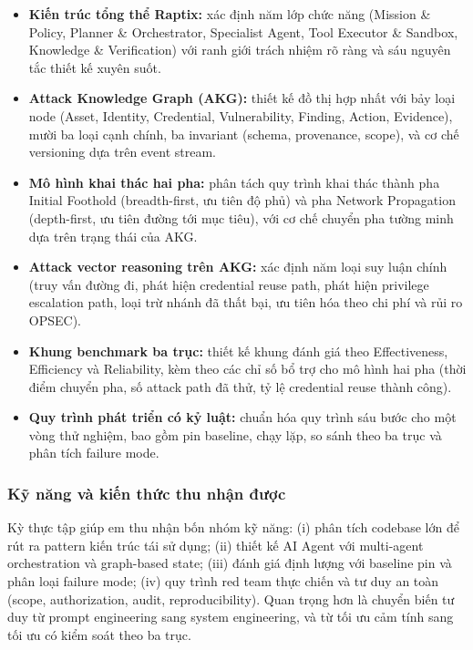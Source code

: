 \begin{itemize}
    \item \textbf{Kiến trúc tổng thể Raptix:} xác định năm lớp chức năng (Mission \& Policy, Planner \& Orchestrator, Specialist Agent, Tool Executor \& Sandbox, Knowledge \& Verification) với ranh giới trách nhiệm rõ ràng và sáu nguyên tắc thiết kế xuyên suốt.
    \item \textbf{Attack Knowledge Graph (AKG):} thiết kế đồ thị hợp nhất với bảy loại node (Asset, Identity, Credential, Vulnerability, Finding, Action, Evidence), mười ba loại cạnh chính, ba invariant (schema, provenance, scope), và cơ chế versioning dựa trên event stream.
    \item \textbf{Mô hình khai thác hai pha:} phân tách quy trình khai thác thành pha Initial Foothold (breadth-first, ưu tiên độ phủ) và pha Network Propagation (depth-first, ưu tiên đường tới mục tiêu), với cơ chế chuyển pha tường minh dựa trên trạng thái của AKG.
    \item \textbf{Attack vector reasoning trên AKG:} xác định năm loại suy luận chính (truy vấn đường đi, phát hiện credential reuse path, phát hiện privilege escalation path, loại trừ nhánh đã thất bại, ưu tiên hóa theo chi phí và rủi ro OPSEC).
    \item \textbf{Khung benchmark ba trục:} thiết kế khung đánh giá theo Effectiveness, Efficiency và Reliability, kèm theo các chỉ số bổ trợ cho mô hình hai pha (thời điểm chuyển pha, số attack path đã thử, tỷ lệ credential reuse thành công).
    \item \textbf{Quy trình phát triển có kỷ luật:} chuẩn hóa quy trình sáu bước cho một vòng thử nghiệm, bao gồm pin baseline, chạy lặp, so sánh theo ba trục và phân tích failure mode.
\end{itemize}


\subsubsection*{Kỹ năng và kiến thức thu nhận được}

Kỳ thực tập giúp em thu nhận bốn nhóm kỹ năng: (i) phân tích codebase lớn để rút ra pattern kiến trúc tái sử dụng; (ii) thiết kế AI Agent với multi-agent orchestration và graph-based state; (iii) đánh giá định lượng với baseline pin và phân loại failure mode; (iv) quy trình red team thực chiến và tư duy an toàn (scope, authorization, audit, reproducibility). Quan trọng hơn là chuyển biến tư duy từ prompt engineering sang system engineering, và từ tối ưu cảm tính sang tối ưu có kiểm soát theo ba trục.

